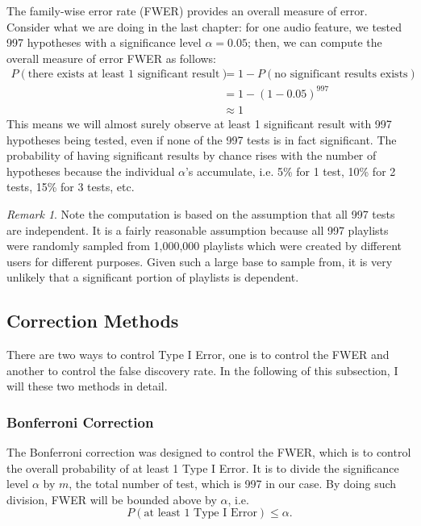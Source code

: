 \documentclass[12pt]{article}
\theoremstyle{plain}
\theoremstyle{definition}
\theoremstyle{remark}
\newtheorem*{remark}{Remark}
\begin{document}
The family-wise error rate (FWER) provides an overall measure of error.\cite{5.1} Consider what we are doing in the last chapter: for one audio feature, we tested 997 hypotheses with a significance level $\alpha=0.05$; then, we can compute the overall measure of error FWER\cite{5.4} as follows:
\begin{align*}
    P(\text{there exists at least 1 significant result})&=1-P(\text{no significant results exists})\\
    &=1-(1-0.05)^{997}\\
    &\approx 1
\end{align*}
This means we will almost surely observe at least 1 significant result with 997 hypotheses being tested, even if none of the 997 tests is in fact significant. The probability of having significant results by chance rises with the number of hypotheses because the individual $\alpha$'s accumulate, i.e. 5\% for 1 test, 10\% for 2 tests, 15\% for 3 tests, etc.\cite{5.4}



\begin{remark}
Note the computation is based on the assumption that all 997 tests are independent. It is a fairly reasonable assumption because all 997 playlists were randomly sampled from 1,000,000 playlists which were created by different users for different purposes. Given such a large base to sample from, it is very unlikely that a significant portion of playlists is dependent.
\end{remark}

\newpage
\subsection{Correction Methods}
There are two ways to control Type I Error, one is to control the FWER and another to control the false discovery rate. In the following of this subsection, I will these two methods in detail.

\subsubsection{Bonferroni Correction}
The Bonferroni correction was designed to control the FWER, which is to control the overall probability of at least 1 Type I Error. It is to divide the significance level $\alpha$ by $m$, the total number of test, which is 997 in our case. By doing such division, FWER will be bounded above by $\alpha$, i.e. 
\[P(\text{at least 1 Type I Error})\leq \alpha.\]
\end{document}

